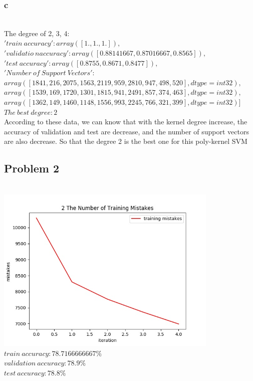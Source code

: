 \documentclass[12pt]{article}
\begin{document}
            \subsubsection{c}
\\ The degree of 2, 3, 4:
\\$'train\ accuracy': array([1., 1., 1.]),$
\\$'validatio\ naccuracy': array ([0.88141667, 0.87016667, 0.8565]),$
\\$'test\ accuracy': array ([0.8755, 0.8671, 0.8477]),$
\\$'Number\ of\ Support\ Vectors': $
\\$array([1841,  216, 2075, 1563, 2119,  959, 2810,  947,  498,  520], dtype=int32),$
\\$array([1539,  169, 1720, 1301, 1815,  941, 2491,  857,  374,  463], dtype=int32),$
\\$array([1362,  149, 1460, 1148, 1556,  993, 2245,  766,  321,  399], dtype=int32)]$
\\ $The\ best\ degree: 2$
\\ According to these data, we can know that with the kernel degree increase, the accuracy of 
validation and test are decrease, and the number of support vectors are also decrease. So that 
the degree 2 is the best one for this poly-kernel SVM
        \subsection{Problem 2}
\\ \includegraphics[height=8cm]{part2.jpg}
\\$train\ accuracy: 78.7166666667 \%$
\\$validation\ accuracy: 78.9 \%$
\\$test\ accuracy: 78.8 \%$
\end{document}
